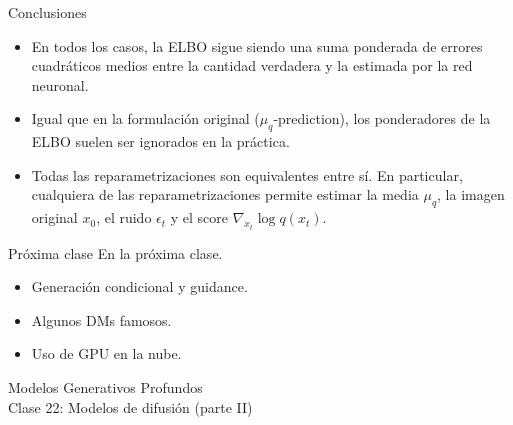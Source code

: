 \documentclass{beamer}
\begin{document}
\begin{frame}{Conclusiones}
    \begin{itemize}
        \item En todos los casos, la ELBO sigue siendo una suma ponderada de errores cuadráticos medios entre la cantidad verdadera y la estimada por la red neuronal.
        \item Igual que en la formulación original ($\mu_q$-prediction), los ponderadores de la ELBO suelen ser ignorados en la práctica.
        \item Todas las reparametrizaciones son equivalentes entre sí. En particular, cualquiera de las reparametrizaciones permite estimar la media $\mu_q$, la imagen original $x_0$, el ruido $\epsilon_t$ y el score $\nabla_{x_t}\log q(x_t)$.
    \end{itemize}
\end{frame}

\begin{frame}{Próxima clase}
    En la próxima clase.
    \begin{itemize}
        \item Generación condicional y guidance.
        \item Algunos DMs famosos.
        \item Uso de GPU en la nube.
    \end{itemize}
\end{frame}

\begin{frame}
    \centering
    \Large{Modelos Generativos Profundos}\\
    \large{Clase 22: Modelos de difusión (parte II)}
\end{frame}
\end{document}
